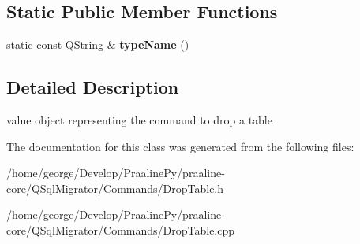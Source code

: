 \subsection*{Static Public Member Functions}
\begin{DoxyCompactItemize}
\item 
\mbox{\label{class_q_sql_migrator_1_1_commands_1_1_drop_table_aca96d6d0a49a212ffa3f79926e9c9d4c}} 
static const Q\+String \& {\bfseries type\+Name} ()
\end{DoxyCompactItemize}


\subsection{Detailed Description}
value object representing the command to drop a table 

The documentation for this class was generated from the following files\+:\begin{DoxyCompactItemize}
\item 
/home/george/\+Develop/\+Praaline\+Py/praaline-\/core/\+Q\+Sql\+Migrator/\+Commands/Drop\+Table.\+h\item 
/home/george/\+Develop/\+Praaline\+Py/praaline-\/core/\+Q\+Sql\+Migrator/\+Commands/Drop\+Table.\+cpp\end{DoxyCompactItemize}
